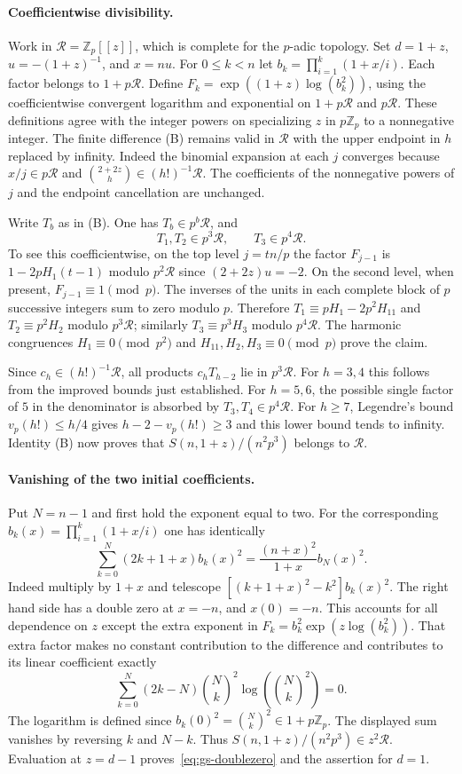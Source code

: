 \documentclass[11pt,a4paper]{article}
\numberwithin{equation}{section}
\begin{document}
\paragraph{Coefficientwise divisibility.}
Work in $\mathcal R=\mathbb Z_p[[z]]$, which is complete for the
$p$-adic topology. Set $d=1+z$, $u=-(1+z)^{-1}$, and $x=nu$.
For $0\le k<n$ let $b_k=\prod_{i=1}^k(1+x/i)$. Each factor belongs
to $1+p\mathcal R$. Define
$F_k=\exp((1+z)\log(b_k^2))$, using the coefficientwise convergent
logarithm and exponential on $1+p\mathcal R$ and $p\mathcal R$.
These definitions agree with the integer powers on specializing
$z$ in $p\mathbb Z_p$ to a nonnegative integer.
The finite difference (B) remains valid in $\mathcal R$ with the
upper endpoint in $h$ replaced by infinity. Indeed the binomial
expansion at each $j$ converges because $x/j\in p\mathcal R$ and
$\binom{2+2z}{h}\in(h!)^{-1}\mathcal R$. The coefficients of
the nonnegative powers of $j$ and the endpoint cancellation are unchanged.

Write $T_b$ as in (B). One has $T_b\in p^b\mathcal R$, and
\[
 T_1,T_2\in p^3\mathcal R,\qquad T_3\in p^4\mathcal R .
\]
To see this coefficientwise, on the top level $j=t n/p$ the factor
$F_{j-1}$ is $1-2pH_1(t-1)$ modulo $p^2\mathcal R$ since
$(2+2z)u=-2$. On the second level, when present, $F_{j-1}\equiv1\pmod p$.
The inverses of the units in each complete block of $p$ successive
integers sum to zero modulo $p$. Therefore
$T_1\equiv pH_1-2p^2H_{11}$ and $T_2\equiv p^2H_2$ modulo
$p^3\mathcal R$; similarly $T_3\equiv p^3H_3$ modulo $p^4\mathcal R$.
The harmonic congruences $H_1\equiv0\pmod{p^2}$ and
$H_{11},H_2,H_3\equiv0\pmod p$ prove the claim.

Since $c_h\in (h!)^{-1}\mathcal R$, all products $c_h T_{h-2}$
lie in $p^3\mathcal R$. For $h=3,4$ this follows from the improved
bounds just established. For $h=5,6$, the possible single factor
of $5$ in the denominator is absorbed by $T_3,T_4\in p^4\mathcal R$.
For $h\ge7$, Legendre's bound $v_p(h!)\le h/4$ gives
$h-2-v_p(h!)\ge3$ and this lower bound tends to infinity.
Identity (B) now proves that $S(n,1+z)/(n^2p^3)$ belongs to
$\mathcal R$.

\paragraph{Vanishing of the two initial coefficients.}
Put $N=n-1$ and first hold the exponent equal to two. For the
corresponding $b_k(x)=\prod_{i=1}^k(1+x/i)$ one has identically
\[
 \sum_{k=0}^N(2k+1+x)b_k(x)^2
  =\frac{(n+x)^2}{1+x}b_N(x)^2 .
\]
Indeed multiply by $1+x$ and telescope
$[(k+1+x)^2-k^2]b_k(x)^2$. The right hand side has a double
zero at $x=-n$, and $x(0)=-n$. This accounts for all dependence on
$z$ except the extra exponent in $F_k=b_k^2\exp(z\log(b_k^2))$.
That extra factor makes no constant contribution to the difference
and contributes to its linear coefficient exactly
\[
 \sum_{k=0}^{N}(2k-N)\binom Nk^{\!2}
             \log\!\left(\binom Nk^{\!2}\right)=0 .
\]
The logarithm is defined since $b_k(0)^2=\binom Nk^2\in1+p\mathbb Z_p$.
The displayed sum vanishes by reversing $k$ and $N-k$. Thus
$S(n,1+z)/(n^2p^3)\in z^2\mathcal R$. Evaluation at $z=d-1$
proves~\eqref{eq:gs-doublezero} and the assertion for $d=1$.
\end{document}
